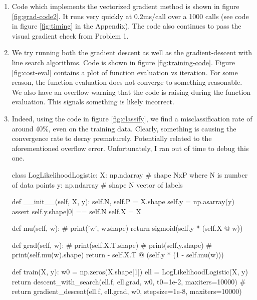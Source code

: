 \documentclass{homework}
\begin{document}
\begin{enumerate}
\item Code which implements the vectorized gradient method is shown in figure \ref{fig:grad-code2}.
It runs very quickly at 0.2ms/call over a 1000 calls (see code in figure \ref{fig:timing} in the Appendix).
The code also continues to pass the visual gradient check from Problem 1.

\item We try running both the gradient descent as well as the gradient-descent with line search algorithms.
Code is shown in figure \ref{fig:training-code}. Figure \ref{fig:cost-eval}
contains a plot of function evaluation vs iteration. For some reason, the
function evaluation does not converge to something reasonable. We also have an overflow warning that the code
is raising during the function evaluation. This signals something is likely incorrect.

\item Indeed, using the code in figure \ref{fig:classify}, we find a misclassification
rate of around 40\%, even on the training data.
Clearly, something is causing the convergence rate to decay prematurely. Potentially related to the aforementioned
overflow error. Unfortunately, I ran out of time to debug this one.



\begin{center}
    \begin{python}
class LogLikelihoodLogistic:
    X: np.ndarray  # shape NxP where N is number of data points
    y: np.ndarray # shape N vector of labels

    def __init__(self, X, y):
        self.N, self.P = X.shape
        self.y = np.asarray(y)
        assert self.y.shape[0] == self.N
        self.X = X

    def mu(self, w):
        # print('w', w.shape)
        return sigmoid(self.y * (self.X @ w))

    def grad(self, w):
        # print(self.X.T.shape)
        # print(self.y.shape)
        # print(self.mu(w).shape)
        return - self.X.T @ (self.y * (1 - self.mu(w)))
    \end{python}
    \label{fig:grad-code2}

\end{center}

\begin{center}
\begin{python}
def train(X, y):
    w0 = np.zeros(X.shape[1])
    ell = LogLikelihoodLogistic(X, y)
    return descent_with_search(ell.f, ell.grad, w0, t0=1e-2, maxiters=10000)
    # return gradient_descent(ell.f, ell.grad, w0, stepsize=1e-8, maxiters=10000)


\end{python}
\end{center}
\end{enumerate}
\end{document}
